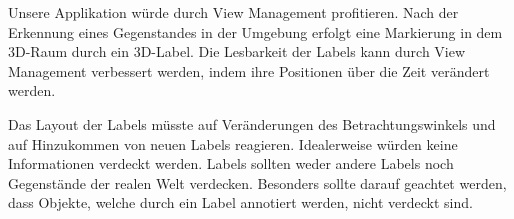 %
%
%
%
%
%
%
%
%
%


%
%



Unsere Applikation würde durch View Management profitieren. Nach der Erkennung eines Gegenstandes in der Umgebung erfolgt eine Markierung in dem 3D-Raum durch ein 3D-Label. Die Lesbarkeit der Labels kann durch View Management verbessert werden, indem ihre Positionen über die Zeit verändert werden. 

Das Layout der Labels müsste auf Veränderungen des Betrachtungswinkels und auf Hinzukommen von neuen Labels reagieren. Idealerweise würden keine Informationen verdeckt werden. Labels sollten weder andere Labels noch Gegenstände der realen Welt verdecken. Besonders sollte darauf geachtet werden, dass Objekte, welche durch ein Label annotiert werden, nicht verdeckt sind.

